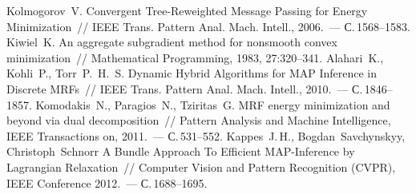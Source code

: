 \documentclass[smaller,unicode,hyperref={unicode=true}]{beamer}
\begin{document}
\begin{thebibliography}{1}
    {Kolmogorov~V.}
    {Convergent Tree-Reweighted Message Passing for Energy Minimization}~//
    {IEEE} Trans. Pattern Anal. Mach. Intell., 2006.~--- С.\,1568--1583.
    {Kiwiel~K.}
    {An aggregate subgradient method for nonsmooth convex minimization}~//
    Mathematical Programming, 1983, 27:320--341.
    {Alahari~K., Kohli~P., Torr~P.~H.~S.}
    {Dynamic Hybrid Algorithms for MAP Inference in Discrete MRFs}~//
    {IEEE} Trans. Pattern Anal. Mach. Intell., 2010.~--- С.\,1846--1857.
    {Komodakis~N., Paragios~N., Tziritas~G.}
    {MRF energy minimization and beyond via dual decomposition}~//
    Pattern Analysis and Machine Intelligence, IEEE Transactions on, 2011.~--- С.\,531--552.
    {Kappes~J.\,H., Bogdan~Savchynskyy, Christoph~Schnorr}
    {A Bundle Approach To Efficient MAP-Inference by Lagrangian Relaxation}~//
    Computer Vision and Pattern Recognition (CVPR), IEEE Conference 2012.~--- С.\,1688--1695.
\end{thebibliography}
\end{document}
